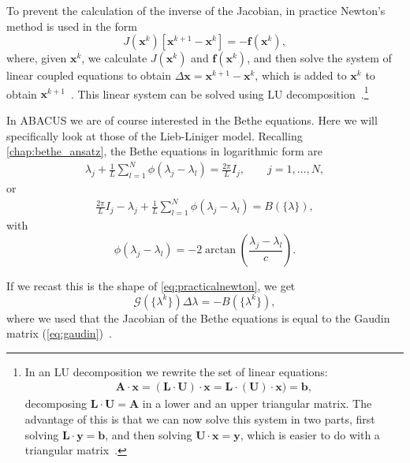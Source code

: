 \documentclass[11pt, a4paper]{report} %
\begin{document}
To prevent the calculation of the inverse of the Jacobian, in practice Newton's method is used in the form
\begin{equation}\label{eq:practicalnewton}
  J(\mathbf{x}^k)[\mathbf{x}^{k+1} - \mathbf{x}^k] = - \mathbf{f}(\mathbf{x}^k),
\end{equation}
where, given \(\mathbf{x}^k\), we calculate \(J(\mathbf{x}^k)\) and \( \mathbf{f}(\mathbf{x}^k)\), and then solve the system of linear coupled equations to obtain \(\Delta\mathbf{x}=\mathbf{x}^{k+1} - \mathbf{x}^k\), which is added to \(\mathbf{x}^k\) to obtain \(\mathbf{x}^{k+1}\)~\cite{Sueli2003}. 
This linear system can be solved using LU decomposition~\cite{Press2007}.\footnote{In an LU decomposition we rewrite the set of linear equations:
  \begin{align}
    \label{eq:54}
    \mathbf{A}\cdot\mathbf{x} = (\mathbf{L}\cdot\mathbf{U}) \cdot \mathbf{x} =\mathbf{L}\cdot(\mathbf{U}) \cdot \mathbf{x}) = \mathbf{b},
  \end{align}
decomposing \(\mathbf{L}\cdot\mathbf{U} = \mathbf{A}\) in a lower and an upper triangular matrix.
The advantage of this is that we can now solve this system in two parts, first solving \(\mathbf{L}\cdot\mathbf{y} = \mathbf{b}\), and then solving \(\mathbf{U}\cdot\mathbf{x} = \mathbf{y}\), which is easier to do with a triangular matrix~\cite{Press2007}.
}

In ABACUS we are of course interested in the Bethe equations.
Here we will specifically look at those of the Lieb-Liniger model.
Recalling \cref{chap:bethe_ansatz}, the Bethe equations in logarithmic form are 
\begin{align}
  \lambda_j + \frac{1}{L} \sum_{l=1}^N \phi(\lambda_j - \lambda_l) = \frac{2\pi}{L}I_j, \qquad j = 1,\ldots,N,
\end{align}
or
\begin{align}
  \frac{2\pi}{L}I_j - \lambda_j + \frac{1}{L} \sum_{l=1}^N \phi(\lambda_j - \lambda_l) = B(\{\lambda\}),
\end{align}
with
\begin{equation}
  \phi(\lambda_j - \lambda_l) = -2\arctan\left(\frac{\lambda_j-\lambda_l}{c}\right).
\end{equation}

If we recast this is the shape of \cref{eq:practicalnewton}, we get
\begin{equation}
  \mathcal{G}(\{\lambda^k\}) \Delta \lambda = -B(\{\lambda^k\}),
\end{equation}
where we used that the Jacobian of the Bethe equations is equal to the Gaudin matrix (\cref{eq:gaudin})~\cite{Caux2009}.
\end{document}
